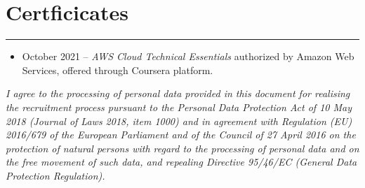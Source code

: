 \documentclass{article}
\begin{document}
\section*{Certficicates}
\hrule \medskip
\begin{itemize}
	\item October 2021 -- \textit{AWS Cloud Technical Essentials} authorized by Amazon Web
	Services, offered through Coursera platform.
\end{itemize}

\vfill
\tiny{
\textit{I agree to the processing of personal data provided in this document for
realising the recruitment process pursuant to the Personal Data Protection Act
of 10 May 2018 (Journal of Laws 2018, item 1000) and in agreement with
Regulation (EU) 2016/679 of the European Parliament and of the Council of 27
April 2016 on the protection of natural persons with regard to the processing of
personal data and on the free movement of such data, and repealing Directive
95/46/EC (General Data Protection Regulation).}
}
\end{document}
